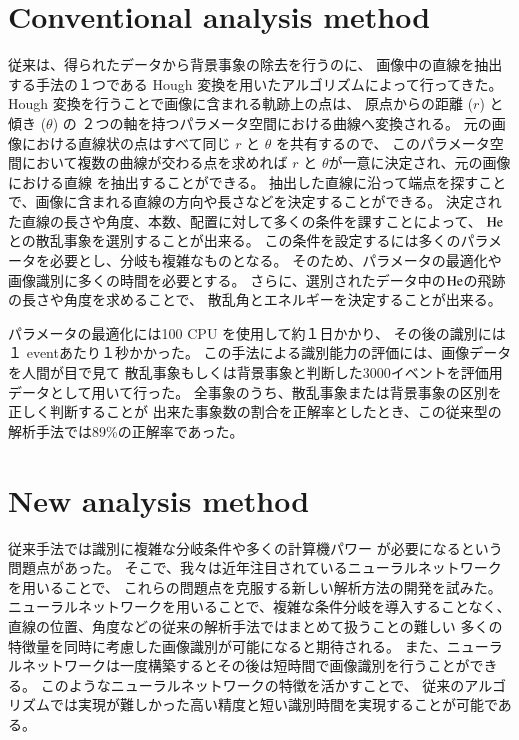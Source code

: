 \documentclass{jps-cp}
\begin{document}
\section{Conventional analysis method}
従来は、得られたデータから背景事象の除去を行うのに、
画像中の直線を抽出する手法の１つである
Hough 変換を用いたアルゴリズムによって行ってきた。
Hough 変換を行うことで画像に含まれる軌跡上の点は、
原点からの距離 ($r$) と傾き ($\theta$) の
２つの軸を持つパラメータ空間における曲線へ変換される。
元の画像における直線状の点はすべて同じ $r$ と $\theta$ を共有するので、
このパラメータ空間において複数の曲線が交わる点を求めれば
$r$ と $\theta$が一意に決定され、元の画像における直線
を抽出することができる。
抽出した直線に沿って端点を探すことで、画像に含まれる直線の方向や長さなどを決定することができる。
決定された直線の長さや角度、本数、配置に対して多くの条件を課すことによって、
$\rm{He}$との散乱事象を選別することが出来る。
この条件を設定するには多くのパラメータを必要とし、分岐も複雑なものとなる。
そのため、パラメータの最適化や画像識別に多くの時間を必要とする。
さらに、選別されたデータ中の$\rm{He}$の飛跡の長さや角度を求めることで、
散乱角とエネルギーを決定することが出来る。

パラメータの最適化には100 CPU を使用して約１日かかり、
その後の識別には１ eventあたり１秒かかった。
この手法による識別能力の評価には、画像データを人間が目で見て
散乱事象もしくは背景事象と判断した3000イベントを評価用データとして用いて行った。
全事象のうち、散乱事象または背景事象の区別を正しく判断することが
出来た事象数の割合を正解率としたとき、この従来型の解析手法では89\%の正解率であった。

\section{New analysis method}


従来手法では識別に複雑な分岐条件や多くの計算機パワー
が必要になるという問題点があった。
そこで、我々は近年注目されているニューラルネットワークを用いることで、
これらの問題点を克服する新しい解析方法の開発を試みた。
ニューラルネットワークを用いることで、複雑な条件分岐を導入することなく、
直線の位置、角度などの従来の解析手法ではまとめて扱うことの難しい
多くの特徴量を同時に考慮した画像識別が可能になると期待される。
また、ニューラルネットワークは一度構築するとその後は短時間で画像識別を行うことができる。
このようなニューラルネットワークの特徴を活かすことで、
従来のアルゴリズムでは実現が難しかった高い精度と短い識別時間を実現することが可能である。
\end{document}
